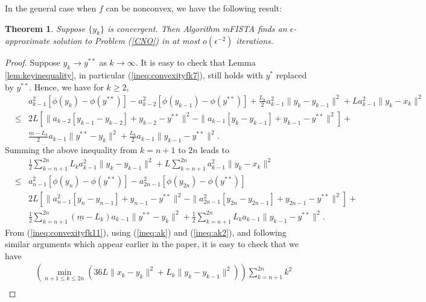 \documentclass[11pt]{article}
\newtheorem{theorem}[thm]{Theorem}
\begin{document}
\noindent In the general case when $f$ can be nonconvex, we have the following result:
\begin{theorem}\label{thm:main3}
Suppose $\{y_k\}$ is convergent.  Then Algorithm mFISTA finds an $\epsilon$-approximate solution to Problem (\ref{CNO}) in at most $o(\epsilon^{-2})$ iterations.
\end{theorem}
\begin{proof}
Suppose $y_k \rightarrow y^{\ast\ast}$ as $k \rightarrow \infty$.  It is easy to check that Lemma \ref{lem:keyinequality}, in particular (\ref{ineq:convexityfk7}), still holds with $y^\ast$ replaced by $y^{\ast\ast}$.  Hence, we have for $k \geq 2$,
\begin{eqnarray*}
& & a_{k-1}^2[\phi(y_{k}) - \phi(y^{\ast\ast})] - a_{k-2}^2 [\phi(y_{k-1}) - \phi(y^{\ast\ast})] + \frac{L_k}{2}a_{k-1}^2\|y_{k} - y_{k-1} \|^2 +  L a_{k-1}^2 \| y_{k} - {x}_{k} \|^2 \\
& \leq &   2 L [\|a_{k-2}[ y_{k-1} - y_{k-2}]  + y_{k-2} - y^{\ast\ast} \|^2 - \| a_{k-1}[ y_{k} - y_{k-1}]  + y_{k-1} - y^{\ast\ast} \|^2] +\\
&   & \frac{\underline{m} - L_k}{2} a_{k-1}  \| y^{\ast\ast} - y_{k} \|^2 + \frac{L_k}{2} a_{k-1} \| y_{k-1} - y^{\ast\ast} \|^2. 
\end{eqnarray*}
Summing the above inequality from $k = n+1$ to $2n$ leads to
\begin{eqnarray}
&   & \frac{1}{2} \sum_{k=n+1}^{2n} L_k a_{k-1}^2 \| y_k - y_{k-1} \|^2 + L \sum_{k=n+1}^{2n} a_{k-1}^2 \| y_k - x_k \|^2 \nonumber \\
& \leq & a_{n-1}^2 [\phi(y_{n}) - \phi(y^{\ast\ast})] - a_{2n-1}^2[\phi(y_{2n}) - \phi(y^{\ast\ast})] \nonumber \\
&   & 2L[\|a_{n-1}^2[y_n - y_{n-1}] + y_{n-1} - y^{\ast\ast} \|^2 - \| a_{2n-1}^2[y_{2n} - y_{2n-1}] + y_{2n-1} - y^{\ast\ast}\|^2] + \nonumber \\
&  & \frac{1}{2} \sum_{k=n+1}^{2n} (\underline{m} - L_k) a_{k-1} \| y^{\ast\ast} - y_k \|^2 + \frac{1}{2} \sum_{k=n+1}^{2n} L_k a_{k-1} \| y_{k-1} - y^{\ast\ast}\|^2. \label{ineq:convexityfk11}
\end{eqnarray}
From (\ref{ineq:convexityfk11}), using (\ref{ineq:ak}) and (\ref{ineq:ak2}), and following similar arguments which appear earlier in the paper, it is easy to check that we have
\begin{eqnarray*}
&  & \left( \min_{n+1 \leq k \leq 2n}  \left( 36L \| x_k - y_k \|^2 + L_k \| y_k - y_{k-1} \|^2 \right) \right) \sum_{k=n+1}^{2n} k^2 \\

\end{eqnarray*}
\end{proof}
\end{document}
